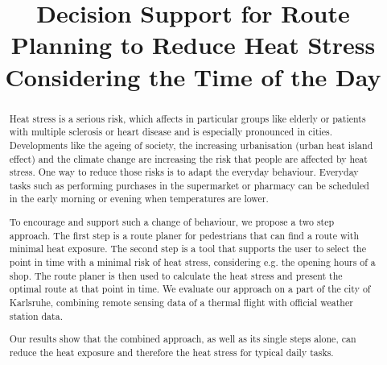 \documentclass[a4paper,parskip=half]{scrartcl}
\title{Decision Support for Route Planning to Reduce Heat Stress Considering the Time of the Day}
\author{}
\begin{document}
\maketitle

\begin{abstract}
	Heat stress is a serious risk, which affects in particular  groups like elderly or patients with multiple sclerosis or heart disease and is especially pronounced in cities. Developments like the ageing of society, the increasing urbanisation (urban heat island effect) and the climate change are increasing the risk that people are affected by heat stress. One way to reduce those risks is to adapt the everyday behaviour. Everyday tasks such as performing purchases in the supermarket or pharmacy can be scheduled in the early morning or evening when temperatures are lower. 
	
To encourage and support such a change of behaviour, we propose a two step approach. The first step is a route planer for pedestrians that can find a route with minimal heat exposure. The second step is a tool that supports the user to select the point in time with a minimal risk of heat stress, considering e.g. the opening hours of a shop. The route planer is then used to calculate the heat stress and present the optimal route at that point in time.
We evaluate our approach on a part of the city of Karlsruhe, combining remote sensing data of a thermal flight with official weather station data. 
	
Our results show that the combined approach, as well as its single steps alone, can reduce the heat exposure and therefore the heat stress for typical daily tasks.
\end{abstract}





%


\printbibliography
\end{document}
